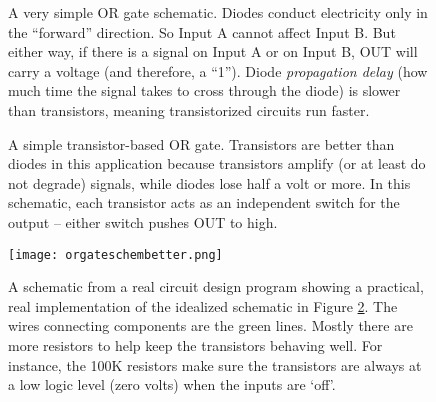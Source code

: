 \begin{figure}[!h]
\begin{center}

\caption{A very simple OR gate schematic. Diodes conduct electricity only in the ``forward'' direction. So Input A cannot affect Input B. But either way, if there is a signal on Input A or on Input B, OUT will carry a voltage (and therefore, a ``1''). Diode \emph{propagation delay} (how much time the signal takes to cross through the diode) is slower than transistors, meaning transistorized circuits run faster.}
\label{fig:diodeorgate}
\end{center}
\end{figure}


\begin{figure}[!ht]
\begin{center}

\caption{A simple transistor-based OR gate. Transistors are better than diodes in this application because transistors amplify (or at least do not degrade) signals, while diodes lose half a volt or more.  In this schematic, each transistor acts as an independent switch for the output -- either switch pushes OUT to high.}
\label{fig:npnorgate}
\end{center}
\end{figure}

\begin{figure}[!ht]
\begin{center}
\texttt{[image: orgateschembetter.png]}
\caption{A schematic from a real circuit design program showing a practical, real implementation of the idealized schematic in Figure \ref{fig:npnorgate}. The wires connecting components are the green lines. Mostly there are more resistors to help keep the transistors behaving well. For instance, the 100K resistors make sure the transistors are always at a low logic level (zero volts) when the inputs are `off'.}
\label{fig:orgateeagleschematic}
\end{center}
\end{figure}





